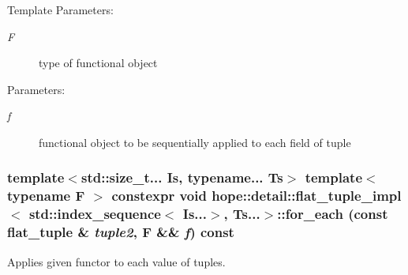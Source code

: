\begin{Desc}
\item[Template Parameters:]
\begin{description}
\item[{\em F}]type of functional object \end{description}
\end{Desc}
\begin{Desc}
\item[Parameters:]
\begin{description}
\item[{\em f}]functional object to be sequentially applied to each field of tuple \end{description}
\end{Desc}
\hypertarget{classhope_1_1detail_1_1flat__tuple__impl_3_01std_1_1index__sequence_3_01_is_8_8_8_4_00_01_ts_8_8_8_4_217b9226418ab5ac765404e6632a8083}{
\subsubsection[{for\_\-each}]{\setlength{\rightskip}{0pt plus 5cm}template$<$std::size\_\-t... Is, typename... Ts$>$ template$<$typename F $>$ constexpr void hope::detail::flat\_\-tuple\_\-impl$<$ std::index\_\-sequence$<$ Is...$>$, Ts...$>$::for\_\-each (const flat\_\-tuple \& {\em tuple2}, \/  F \&\& {\em f}) const}}
\label{classhope_1_1detail_1_1flat__tuple__impl_3_01std_1_1index__sequence_3_01_is_8_8_8_4_00_01_ts_8_8_8_4_217b9226418ab5ac765404e6632a8083}


Applies given functor to each value of tuples. 

